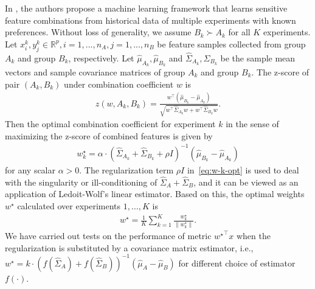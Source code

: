 \documentclass[11pt]{article}
\def\R{\mathbb{R}}
\newcommand{\opt}{^\star}
\def\transpose{\top}
\def\R{\mathbb{R}}
\newcommand{\wh}{\widehat}
\begin{document}
In \cite{ref:kharitonov2017learning}, the authors propose a machine learning framework that learns sensitive feature combinations from historical data of multiple experiments with known preferences. Without loss of generality, we assume $B_k\succ A_k$ for all $K$ experiments. Let $x_i^k, y_j^k\in \R^p, i=1,...,n_A, j=1,...,n_B$ be feature samples collected from group $A_k$ and group $B_k$, respectively. Let $\wh\mu_{A_k}, \wh \mu_{B_k}$ and $\wh \Sigma_{A_k}, \wh\Sigma_{B_k}$ be the sample mean vectors and sample covariance matrices of group $A_k$ and group $B_k$. The z-score of pair $(A_k, B_k)$ under combination coefficient $w$ is
\begin{align}\label{eq:z-score}
    z(w, A_k, B_k) = \frac{{w}^\transpose(\wh\mu_{B_k}-\wh\mu_{A_k})}{\sqrt{{w}^\transpose \wh\Sigma_{A_k} w + {w}^\transpose \wh\Sigma_{B_k} w}}. 
\end{align}
Then the optimal combination coefficient for experiment $k$ in the sense of maximizing the z-score of combined features is given by 
\begin{align}\label{eq:w-k-opt}
    w_k\opt = \alpha\cdot (\wh \Sigma_{A_k}+\wh\Sigma_{B_k}+ \rho I)^{-1} (\wh \mu_{B_k}-\wh\mu_{A_k})
\end{align}
for any scalar $\alpha> 0$. 
The regularization term $ \rho I$ in~\eqref{eq:w-k-opt} is used to deal with the singularity or ill-conditioning of $\wh \Sigma_A+\wh\Sigma_B$, and it can be viewed as an application of Ledoit-Wolf's linear estimator.
Based on this, the optimal weights $w\opt$ calculated over experiments $1,\ldots,K$ is
\begin{align}\label{eq:w-opt}
    w\opt=\frac{1}{K} \sum_{k=1}^K \frac{w_k\opt}{\|w_k\opt\|}.
\end{align}
We have carried out tests on the performance of metric ${w\opt}^\transpose x$ when the regularization is substituted by a covariance matrix estimator, i.e., $w\opt=k\cdot (f(\wh \Sigma_A)+f(\wh\Sigma_B))^{-1} (\wh\mu_A- \wh \mu_B)$ for different choice of estimator $f(\cdot)$. 
\end{document}

